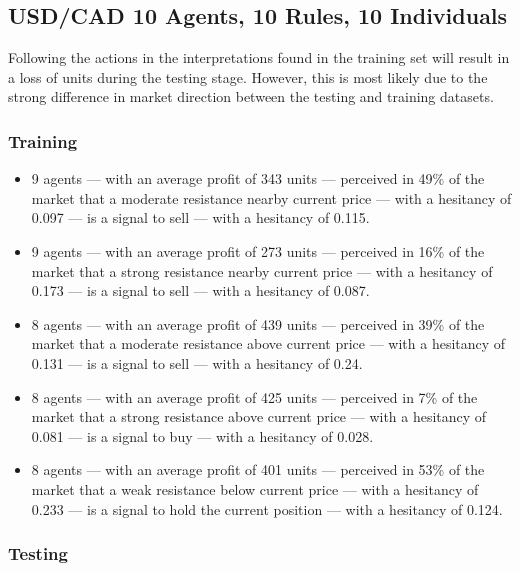 \subsection{USD/CAD 10 Agents, 10 Rules, 10 Individuals}
\label{results:interpretation-usd-cad-10agents-10rules-10individuals}

Following the actions in the interpretations found in the training set will result in a loss of units during the testing stage. However, this is most likely due to the strong difference in market direction between the testing and training datasets.

\subsubsection{Training}

{\small
  \begin{itemize}
  \item 9 agents — with an average profit of 343 units — perceived in 49\% of
    the market that a moderate resistance nearby current price — with a
    hesitancy of 0.097 — is a signal to sell — with a hesitancy of 0.115.
  \item 9 agents — with an average profit of 273 units — perceived in 16\% of
    the market that a strong resistance nearby current price — with a hesitancy
    of 0.173 — is a signal to sell — with a hesitancy of 0.087.
  \item 8 agents — with an average profit of 439 units — perceived in 39\% of
    the market that a moderate resistance above current price — with a hesitancy
    of 0.131 — is a signal to sell — with a hesitancy of 0.24.
  \item 8 agents — with an average profit of 425 units — perceived in 7\% of the
    market that a strong resistance above current price — with a hesitancy of
    0.081 — is a signal to buy — with a hesitancy of 0.028.
  \item 8 agents — with an average profit of 401 units — perceived in 53\% of
    the market that a weak resistance below current price — with a hesitancy of
    0.233 — is a signal to hold the current position — with a hesitancy of
    0.124.
  \end{itemize}
}

\subsubsection{Testing}

